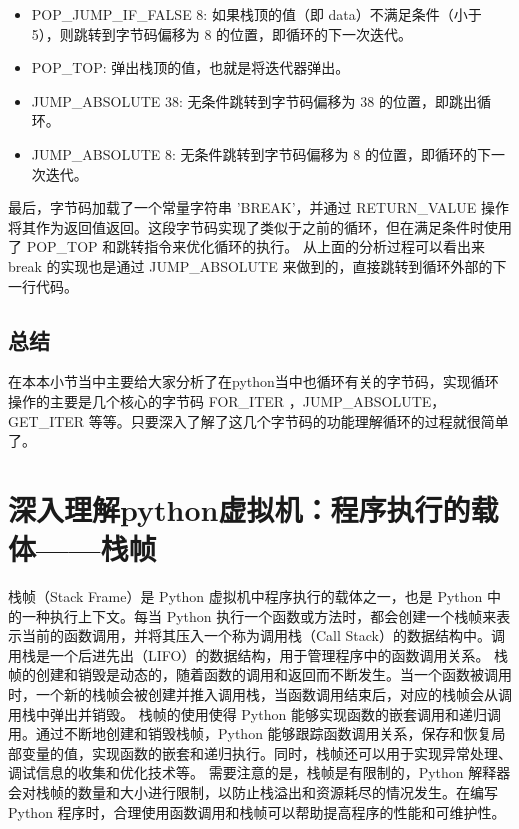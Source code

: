 \begin{itemize}
\item POP\_JUMP\_IF\_FALSE 8: 如果栈顶的值（即 data）不满足条件（小于 5），则跳转到字节码偏移为 8 的位置，即循环的下一次迭代。 
\item POP\_TOP: 弹出栈顶的值，也就是将迭代器弹出。 
\item JUMP\_ABSOLUTE 38: 无条件跳转到字节码偏移为 38 的位置，即跳出循环。 
\item JUMP\_ABSOLUTE 8: 无条件跳转到字节码偏移为 8 的位置，即循环的下一次迭代。 
\end{itemize}
最后，字节码加载了一个常量字符串 'BREAK'，并通过 RETURN\_VALUE 操作将其作为返回值返回。这段字节码实现了类似于之前的循环，但在满足条件时使用了 POP\_TOP 和跳转指令来优化循环的执行。
从上面的分析过程可以看出来 break 的实现也是通过 JUMP\_ABSOLUTE 来做到的，直接跳转到循环外部的下一行代码。
\subsection{总结}
在本本小节当中主要给大家分析了在python当中也循环有关的字节码，实现循环操作的主要是几个核心的字节码 FOR\_ITER ，JUMP\_ABSOLUTE，GET\_ITER 等等。只要深入了解了这几个字节码的功能理解循环的过程就很简单了。


\section{深入理解python虚拟机：程序执行的载体——栈帧}
栈帧（Stack Frame）是 Python 虚拟机中程序执行的载体之一，也是 Python 中的一种执行上下文。每当 Python 执行一个函数或方法时，都会创建一个栈帧来表示当前的函数调用，并将其压入一个称为调用栈（Call Stack）的数据结构中。调用栈是一个后进先出（LIFO）的数据结构，用于管理程序中的函数调用关系。
栈帧的创建和销毁是动态的，随着函数的调用和返回而不断发生。当一个函数被调用时，一个新的栈帧会被创建并推入调用栈，当函数调用结束后，对应的栈帧会从调用栈中弹出并销毁。
栈帧的使用使得 Python 能够实现函数的嵌套调用和递归调用。通过不断地创建和销毁栈帧，Python 能够跟踪函数调用关系，保存和恢复局部变量的值，实现函数的嵌套和递归执行。同时，栈帧还可以用于实现异常处理、调试信息的收集和优化技术等。
需要注意的是，栈帧是有限制的，Python 解释器会对栈帧的数量和大小进行限制，以防止栈溢出和资源耗尽的情况发生。在编写 Python 程序时，合理使用函数调用和栈帧可以帮助提高程序的性能和可维护性。
